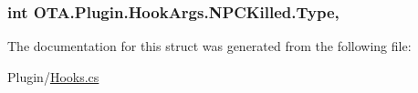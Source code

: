 \subsubsection[{Type}]{\setlength{\rightskip}{0pt plus 5cm}int O\+T\+A.\+Plugin.\+Hook\+Args.\+N\+P\+C\+Killed.\+Type\hspace{0.3cm}{\ttfamily [get]}, {\ttfamily [set]}}\label{struct_o_t_a_1_1_plugin_1_1_hook_args_1_1_n_p_c_killed_ab65f8272aad0965ebd94537273e53d73}


The documentation for this struct was generated from the following file\+:\begin{DoxyCompactItemize}
\item 
Plugin/\hyperlink{_hooks_8cs}{Hooks.\+cs}\end{DoxyCompactItemize}
